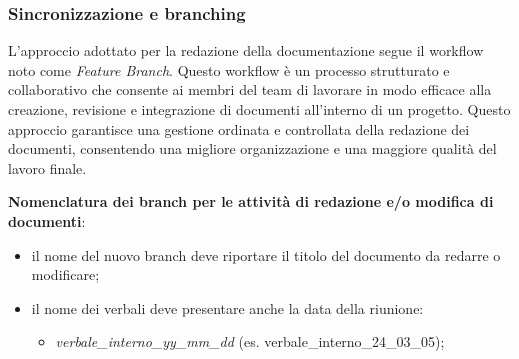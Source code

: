 \subsubsection{Sincronizzazione e branching}

	\label{nomenclatura}
L'approccio adottato per la redazione della documentazione segue il workflow noto come \textit{Feature Branch}. Questo workflow è un processo strutturato e collaborativo che consente ai membri del team di lavorare in modo efficace alla creazione, revisione e integrazione di documenti all'interno di un progetto. Questo approccio garantisce una gestione ordinata e controllata della redazione dei documenti, consentendo una migliore organizzazione e una maggiore qualità del lavoro finale.
\begin{flushleft}
\textbf{Nomenclatura dei branch per le attività di redazione e/o modifica di documenti}: \label{convenzioni_nomenclatura}
\end{flushleft}
\begin{itemize}
	\item il nome del nuovo branch deve riportare il titolo del documento da redarre o modificare;
	\item il nome dei verbali deve presentare anche la data della riunione: 
		\begin{itemize}
			\item \textit{verbale\_interno\_yy\_mm\_dd} (es. verbale\_interno\_24\_03\_05);
		\end{itemize}
\end{itemize}

